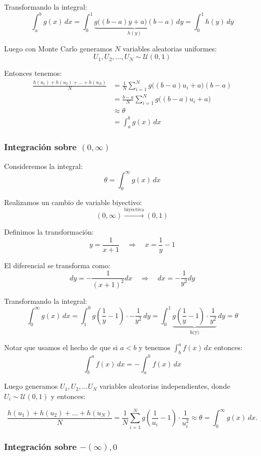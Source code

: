 \documentclass[11pt, a4paper]{article}
\theoremstyle{definition}
\begin{document}
Transformando la integral:
\[
\int_{a}^{b} g(x) \, dx = \int_{0}^{1} \underbrace{g\big((b-a)y + a\big)(b-a)}_{h(y)} \, dy = \int_{0}^{1} h(y) \, dy
\]

Luego con Monte Carlo generamos $N$ variables aleatorias uniformes:
\[
U_1, U_2, \ldots, U_N \sim \mathcal{U}(0,1)
\]

Entonces tenemos:
\begin{align*}
    \frac{h(u_1) + h(u_2) + \ldots + h(u_N)}{N}
    &= \frac{1}{N}\sum_{i=1}^N g\big((b-a)u_i + a\big)(b-a) \\ 
    &= \frac{b-a}{N} \sum_{i=1}^N g\big((b-a)u_i + a\big) \\
    &\approx \theta \\
    &= \int_{a}^{b} g(x)\, dx
\end{align*}

\subsubsection{Integración sobre $(0, \infty)$}

Consideremos la integral:
\[
\theta = \int_{0}^{\infty} g(x) \, dx
\]

Realizamos un cambio de variable biyectivo:
\[
(0, \infty) \xrightarrow{\text{biyectiva}} (0, 1)
\]

Definimos la transformación:
\[
y = \frac{1}{x+1} \quad \Rightarrow \quad x = \frac{1}{y} - 1
\]

El diferencial se transforma como:
\[
dy = -\frac{1}{(x+1)^2}dx \quad \Rightarrow \quad dx = -\frac{1}{y^2}dy
\]


Transformando la integral:
\[
\int_{0}^{\infty} g(x) \, dx = \int_{1}^{0} g\left(\frac{1}{y} - 1\right) \cdot -\frac{1}{y^2} \, dy = \int_{0}^{1} 
\underbrace{g\left(\frac{1}{y} - 1\right) \cdot \frac{1}{y^2}}_{\text{h(y)}} \, dy = \theta
\]


Notar que usamos el hecho de que si $a < b$ y tenemos $\int_{b}^{a} f(x) \, dx$ entonces:
\[
\int_{b}^{a} f(x) \, dx = -\int_{a}^{b} f(x) \, dx
\]

Luego generamos $U_1, U_2, \ldots U_N$ variables aleatorias independientes, donde $U_i \sim \mathcal{U}(0,1)$ y entonces:

\[
    \frac{h(u_1) + h(u_2) + \ldots + h(u_N)}{N} = \frac{1}{N} \sum_{i=1}^{N} g(\frac{1}{u_i} - 1) \cdot \frac{1}{u_i^{2}}  \approx \theta = \int_{0}^{\infty} g(x) \, dx.
\]

\subsubsection{Integración sobre $-(\infty), 0 $}
\end{document}
